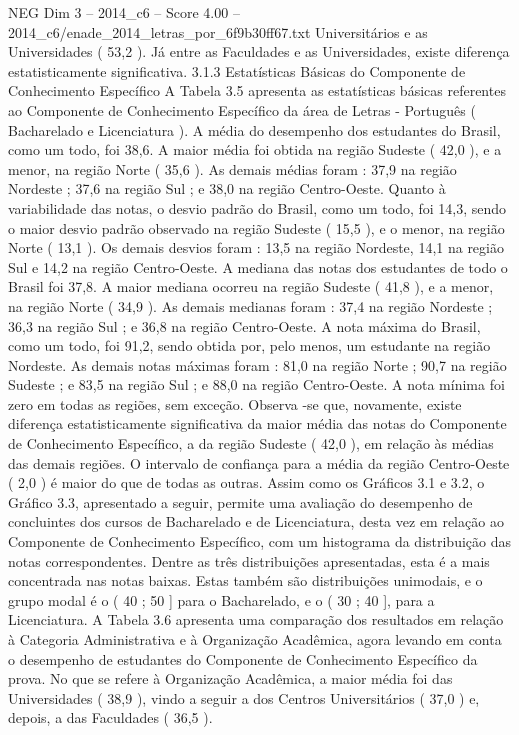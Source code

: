 \begin{textsample}{NEG Dim 3 – 2014\_c6 – Score 4.00 – 2014\_c6/enade\_2014\_letras\_por\_6f9b30ff67.txt}
Universitários e as Universidades ( 53,2 ).
Já entre as Faculdades e as Universidades, existe diferença estatisticamente significativa. 3.1.3 Estatísticas Básicas do Componente de Conhecimento Específico A Tabela 3.5 apresenta as estatísticas básicas referentes ao Componente de Conhecimento Específico da área de Letras - Português ( Bacharelado e Licenciatura ).
A média do desempenho dos estudantes do Brasil, como um todo, foi 38,6.
A maior média foi obtida na região Sudeste ( 42,0 ), e a menor, na região Norte ( 35,6 ).
As demais médias foram : 37,9 na região Nordeste ; 37,6 na região Sul ; e 38,0 na região Centro-Oeste.
Quanto à variabilidade das notas, o desvio padrão do Brasil, como um todo, foi 14,3, sendo o maior desvio padrão observado na região Sudeste ( 15,5 ), e o menor, na região Norte ( 13,1 ).
Os demais desvios foram : 13,5 na região Nordeste, 14,1 na região Sul e 14,2 na região Centro-Oeste.
A mediana das notas dos estudantes de todo o Brasil foi 37,8.
A maior mediana ocorreu na região Sudeste ( 41,8 ), e a menor, na região Norte ( 34,9 ).
As demais medianas foram : 37,4 na região Nordeste ; 36,3 na região Sul ; e 36,8 na região Centro-Oeste.
A nota máxima do Brasil, como um todo, foi 91,2, sendo obtida por, pelo menos, um estudante na região Nordeste.
As demais notas máximas foram : 81,0 na região Norte ; 90,7 na região Sudeste ; e 83,5 na região Sul ; e 88,0 na região Centro-Oeste.
A nota mínima foi zero em todas as regiões, sem exceção.
Observa -se que, novamente, existe diferença estatisticamente significativa da maior média das notas do Componente de Conhecimento Específico, a da região Sudeste ( 42,0 ), em relação às médias das demais regiões.
O intervalo de confiança para a média da região Centro-Oeste ( 2,0 ) é maior do que de todas as outras.
Assim como os Gráficos 3.1 e 3.2, o Gráfico 3.3, apresentado a seguir, permite uma avaliação do desempenho de concluintes dos cursos de Bacharelado e de Licenciatura, desta vez em relação ao Componente de Conhecimento Específico, com um histograma da distribuição das notas correspondentes.
Dentre as três distribuições apresentadas, esta é a mais concentrada nas notas baixas.
Estas também são distribuições unimodais, e o grupo modal é o ( 40 ; 50 ] para o Bacharelado, e o ( 30 ; 40 ], para a Licenciatura.
A Tabela 3.6 apresenta uma comparação dos resultados em relação à Categoria Administrativa e à Organização Acadêmica, agora levando em conta o desempenho de estudantes do Componente de Conhecimento Específico da prova.
No que se refere à Organização Acadêmica, a maior média foi das Universidades ( 38,9 ), vindo a seguir a dos Centros Universitários ( 37,0 ) e, depois, a das Faculdades ( 36,5 ).

\end{textsample}
